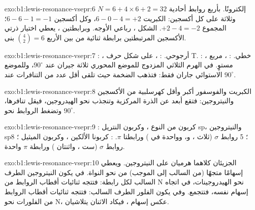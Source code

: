 \begin{solution}{exo:b1:lewis-resonance-vsepr:6}
$N = 6 + 4 \times 6 + 2 = 32$ إلكترونًا. بأربع روابط أحادية وثلاثة
 على كل أكسجين: الكبريت $6 - 0 - 4 = +2$، وكل أكسجين
$6 - 6 - 1 = -1$؛ المجموع $+2 - 4 = -2$. الشكل ، رباعي الأوجه. وبرابطتين
، يعطي اختيار ذرتي الأكسجين المرتبطتين برابطة ثنائية من بين
الأربع $\binom{4}{2} = 6$ بنى.
\end{solution}

\begin{solution}{exo:b1:lewis-resonance-vsepr:7}
: ، أرجوحي. : ، على شكل حرف T.
: ، خطي. : ، مربع مستوٍ. في
الهرم الثلاثي المزدوج للموضع المحوري ثلاثة جيران عند $90^\circ$،
وللموضع الاستوائي جاران فقط: فتذهب  الضخمة حيث تلقى
أقل عدد من التنافرات عند $90^\circ$.
\end{solution}

\begin{solution}{exo:b1:lewis-resonance-vsepr:8}
الكبريت والفوسفور أكبر وأقل كهرسلبية من الأكسجين
والنيتروجين: فتقع  أبعد عن الذرة المركزية وتنجذب
نحو الهيدروجين، فيقل تنافرها، وتضغط  الروابط نحو $90^\circ$.
\end{solution}

\begin{solution}{exo:b1:lewis-resonance-vsepr:9}
: كربون  من النوع ، وكربون النتريل sp،
والنيتروجين sp؛ 5 روابط $\sigma$ (ثلاث ، و، وواحدة في
) ورابطتا $\pi$. : كربونا الألكين
، وكربون الميثيل ؛ 8 روابط $\sigma$ (ست ، واثنتان
) ورابطة $\pi$ واحدة.
\end{solution}

\begin{solution}{exo:b1:lewis-resonance-vsepr:10}
الجزيئان كلاهما هرميان  على النيتروجين. ويعطي 
إسهامًا متجهًا (من السالب إلى الموجب) من 
نحو النواة. في  يكون النيتروجين الطرف السالب لكل
رابطة: فتتجه ثنائيات أقطاب الروابط من N نحو الهيدروجينات، في
اتجاه إسهام  نفسه، فتتجمع. وفي 
يكون الفلور الطرف السالب: فتتجه ثنائيات أقطاب الروابط من الفلورات
نحو N، عكس إسهام ، فيكاد الاثنان يتلاشيان.
\end{solution}

